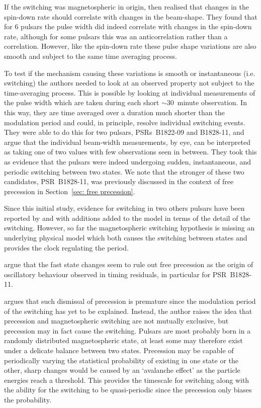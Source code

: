 If the switching was magnetospheric in origin, then \citet{Lyne2010} realised
that changes in the spin-down rate should correlate with changes in the
beam-shape.  They found that for 6 pulsars the pulse width did indeed correlate
with changes in the spin-down rate, although for some pulsars this was an
anticorrelation rather than a correlation. However, like the spin-down rate
these pulse shape variations are also smooth and subject to the same time
averaging process. 

To test if the mechanism causing these variations is smooth or instantaneous
(i.e. switching) the authors needed to look at an observed property not subject
to the time-averaging process.  This is possible by looking at individual
measurements of the pulse width which are taken during each short $\sim30$~minute
observation. In this way, they are time averaged over a duration much shorter
than the modulation period and could, in principle, resolve individual
switching events. They were able to do this for two pulsars, PSRs~B1822-09 and
B1828-11, and argue that the individual beam-width measurements, by eye, can be
interpreted as taking one of two values with few observations seen in between.
They took this as evidence that the pulsars were indeed undergoing sudden,
instantaneous, and periodic switching between two states. We note that the
stronger of these two candidates, PSR~B1828-11, was previously discussed in the
context of free precession in Section~\ref{sec: free precession}.

Since this initial study, evidence for switching in two others pulsars have
been reported by \citet{Perera2014} and \citet{Perera2016} with additions added
to the model in terms of the detail of the switching. However, so far the
magnetospheric switching hypothesis is missing an underlying physical model
which both causes the switching between states and provides the clock regulating
the period.

\citet{Lyne2010} argue that the fast state changes seem to rule out free
precession as the origin of oscillatory behaviour observed in timing residuals,
in particular for PSR~B1828-11.

\citet{Jones2012} argues that such dismissal of precession is premature since
the modulation period of the switching has yet to be explained.  Instead, the
author raises the idea that precession and magnetospheric switching are not
mutually exclusive, but precession may in fact cause the switching. Pulsars are
most probably born in a randomly distributed magnetospheric state, at least
some may therefore exist under a delicate balance between two states.
Precession may be capable of periodically varying the statistical probability
of existing in one state or the other, sharp changes would be caused by an
`avalanche effect' as the particle energies reach a threshold.  This provides
the timescale for switching along with the ability for the switching to be
quasi-periodic since the precession only biases the probability.

